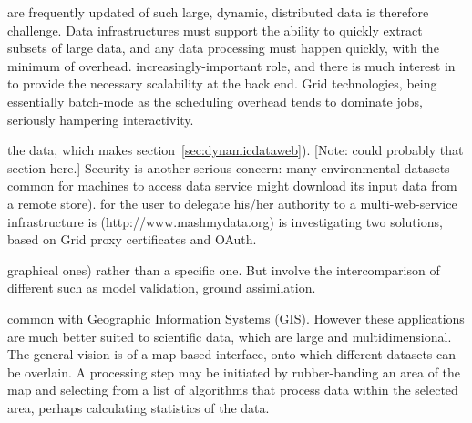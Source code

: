 \documentclass[times]{cpeauth}
\begin{document}
are frequently updated %
of such large, dynamic, distributed data is therefore %
challenge.  Data infrastructures must support the ability to quickly extract %
subsets of large data, and any data processing must happen quickly, with the
minimum of overhead.  %
increasingly-important role, and there is much interest in %
to provide the necessary scalability at the back end.  Grid technologies, being
essentially batch-mode %
as the scheduling overhead tends to dominate %
jobs, seriously hampering interactivity.

the data, which makes %
section~\ref{sec:dynamicdataweb}).  [Note: could probably %
that section here.]  Security is another serious concern: many environmental
datasets %
common for machines to access data %
service might download its input data from a remote store).  %
for the user to delegate his/her authority to a multi-web-service infrastructure
is %
(http://www.mashmydata.org) is investigating two solutions, based %
on Grid proxy certificates and OAuth.



graphical ones) rather than a specific one.  But %
involve the intercomparison of different %
such as model validation, ground %
assimilation.


common with Geographic Information Systems (GIS). However these applications are
much better suited to scientific data, which are large and multidimensional.
The general vision is of a map-based interface, onto which different datasets
can be overlain.  A processing step may be initiated by rubber-banding an area
of the map and selecting from a list of algorithms that process data within the
selected area, perhaps calculating statistics of the data.
\end{document}
